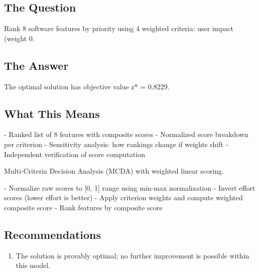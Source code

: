 \documentclass[11pt, a4paper]{article}
\begin{document}
\subsection{The Question}
Rank 8 software features by priority using 4 weighted criteria: user impact
(weight 0.

\subsection{The Answer}

\begin{polyainsight}[title={Bottom Line}]
The optimal solution has objective value z* = 0.8229.
\end{polyainsight}

\subsection{What This Means}

- Ranked list of 8 features with composite scores
- Normalized score breakdown per criterion
- Sensitivity analysis: how rankings change if weights shift
- Independent verification of score computation

Multi-Criteria Decision Analysis (MCDA) with weighted linear scoring.

- Normalize raw scores to [0, 1] range using min-max normalization
- Invert effort scores (lower effort is better)
- Apply criterion weights and compute weighted composite score
- Rank features by composite score



\subsection{Recommendations}

\begin{enumerate}
  \item The solution is provably optimal; no further improvement is possible within this model.
\end{enumerate}

\end{document}
